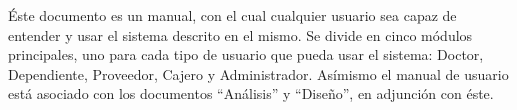 \'Este documento es un manual, con el cual cualquier usuario sea capaz de entender y usar el sistema descrito en el mismo. Se divide en cinco m\'odulos principales, uno para cada tipo de usuario que pueda usar el sistema: Doctor, Dependiente, Proveedor, Cajero y Administrador.
As\'imismo el manual de usuario est\'a asociado con los documentos "`An\'alisis"' y "`Diseño"', en adjunci\'on con \'este.
